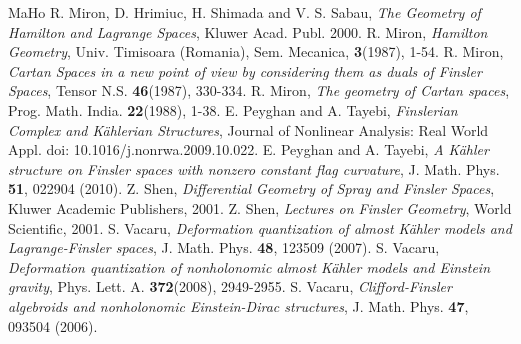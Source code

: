 \documentclass[10pt,a4paper]{article}
\theoremstyle{plain}
\theoremstyle{definition}
\begin{document}
\begin{thebibliography}{MaHo}
 R. Miron, D. Hrimiuc, H. Shimada and V. S. Sabau, {\it The Geometry of Hamilton and
Lagrange Spaces}, Kluwer Acad. Publ.  2000.
 R. Miron, {\it Hamilton Geometry}, Univ. Timisoara (Romania), Sem. Mecanica, {\bf 3}(1987), 1-54.
 R. Miron, {\it Cartan Spaces in a new point of view by considering them as duals
of Finsler Spaces}, Tensor N.S. {\bf 46}(1987), 330-334.
 R. Miron, {\it The geometry of Cartan spaces}, Prog. Math. India. {\bf 22}(1988), 1-38.
 E. Peyghan and A. Tayebi, {\it Finslerian Complex and K\"{a}hlerian Structures}, Journal of Nonlinear Analysis: Real World  Appl. doi: 10.1016/j.nonrwa.2009.10.022.
 E. Peyghan and A. Tayebi, {\it A K\"{a}hler structure on Finsler spaces with nonzero constant flag curvature}, J. Math. Phys. {\bf 51}, 022904 (2010).
 Z. Shen, {\it Differential Geometry of Spray and Finsler Spaces}, Kluwer Academic Publishers,  2001.
 Z. Shen, {\it Lectures on Finsler Geometry}, World Scientific, 2001.
 S. Vacaru, {\it Deformation quantization of almost K\"{a}hler models and Lagrange-Finsler spaces}, J. Math. Phys. {\bf 48}, 123509 (2007).
 S. Vacaru, {\it Deformation quantization of nonholonomic almost K\"{a}hler models
and Einstein gravity}, Phys. Lett. A.  {\bf 372}(2008), 2949-2955.
 S. Vacaru, {\it Clifford-Finsler algebroids and nonholonomic Einstein-Dirac structures}, J. Math. Phys. {\bf 47}, 093504 (2006).
\end{thebibliography}
\end{document}

